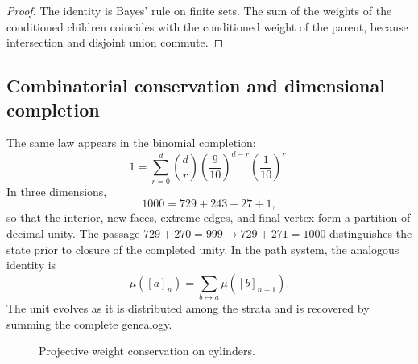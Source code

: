 \begin{proof}
The identity is Bayes' rule on finite sets. The sum of the
weights of the conditioned children coincides with the conditioned weight of the parent,
because intersection and disjoint union commute.
\end{proof}

\subsection{Combinatorial conservation and dimensional completion}

The same law appears in the binomial completion:
\[
 1=\sum_{r=0}^{d}\binom dr
 \left(\frac9{10}\right)^{d-r}
 \left(\frac1{10}\right)^r.
\]
In three dimensions,
\[
 1000=729+243+27+1,
\]
so that the interior, new faces, extreme edges, and final vertex form
a partition of decimal unity. The passage
\(729+270=999\to729+271=1000\) distinguishes the state prior to closure of the
completed unity. In the path system, the analogous identity is
\[
 \mu([a]_n)=\sum_{b\mapsto a}\mu([b]_{n+1}).
\]
The unit evolves as it is distributed among the strata and is recovered by summing
the complete genealogy.

\begin{figure}[htbp]
\centering
{}
\caption{Projective weight conservation on cylinders.}
\label{p12-83-c6-s1:fig:conservacion-peso-cilindros}
\end{figure}

